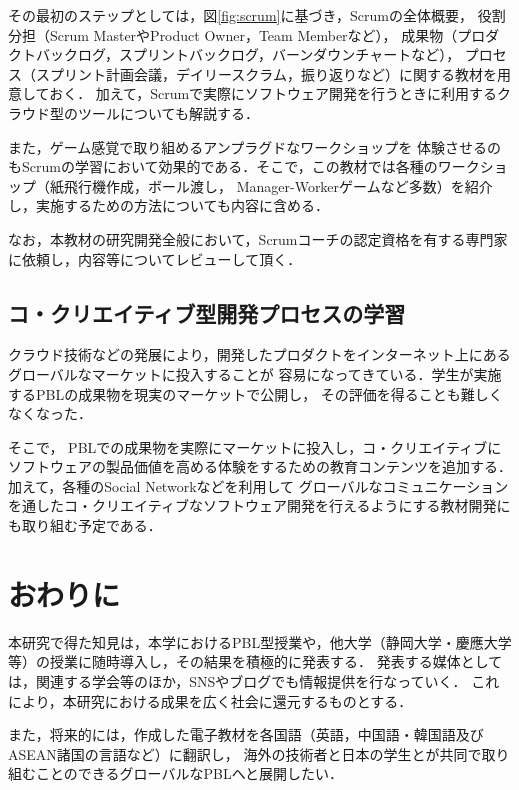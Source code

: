 \documentclass[a4j,9pt,twocolumn,twoside]{jsarticle}
\begin{document}
	その最初のステップとしては，図\ref{fig:scrum}に基づき，Scrumの全体概要，
	役割分担（Scrum MasterやProduct Owner，Team Memberなど），
	成果物（プロダクトバックログ，スプリントバックログ，バーンダウンチャートなど），
	プロセス（スプリント計画会議，デイリースクラム，振り返りなど）に関する教材を用意しておく．
	加えて，Scrumで実際にソフトウェア開発を行うときに利用するクラウド型のツールについても解説する．

	また，ゲーム感覚で取り組めるアンプラグドなワークショップを
	体験させるのもScrumの学習において効果的である．そこで，この教材では各種のワークショップ（紙飛行機作成，ボール渡し，
	Manager-Workerゲームなど多数）を紹介し，実施するための方法についても内容に含める．

	なお，本教材の研究開発全般において，Scrumコーチの認定資格を有する専門家に依頼し，内容等についてレビューして頂く．

\subsection{コ・クリエイティブ型開発プロセスの学習}
	クラウド技術などの発展により，開発したプロダクトをインターネット上にあるグローバルなマーケットに投入することが
	容易になってきている．学生が実施するPBLの成果物を現実のマーケットで公開し，
	その評価を得ることも難しくなくなった．
	
	そこで，
	PBLでの成果物を実際にマーケットに投入し，コ・クリエイティブにソフトウェアの製品価値を高める体験をするための教育コンテンツを追加する．
	加えて，各種のSocial Networkなどを利用して
	グローバルなコミュニケーションを通したコ・クリエイティブなソフトウェア開発を行えるようにする教材開発にも取り組む予定である．

\section{おわりに}\label{sec:fin}
	本研究で得た知見は，本学におけるPBL型授業や，他大学（静岡大学・慶應大学等）の授業に随時導入し，その結果を積極的に発表する．
	発表する媒体としては，関連する学会等のほか，SNSやブログでも情報提供を行なっていく．
	これにより，本研究における成果を広く社会に還元するものとする．
	
	また，将来的には，作成した電子教材を各国語（英語，中国語・韓国語及びASEAN諸国の言語など）に翻訳し，
	海外の技術者と日本の学生とが共同で取り組むことのできるグローバルなPBLへと展開したい．
	
\end{document}
